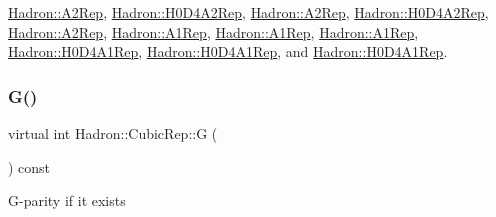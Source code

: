 \mbox{\hyperlink{structHadron_1_1A2Rep_a6c2da481eeb98634c640e8f17a569eea}{Hadron\+::\+A2\+Rep}}, \mbox{\hyperlink{structHadron_1_1H0D4A2Rep_a637522dc6caee2869b2bb632a4c5a5b5}{Hadron\+::\+H0\+D4\+A2\+Rep}}, \mbox{\hyperlink{structHadron_1_1A2Rep_a6c2da481eeb98634c640e8f17a569eea}{Hadron\+::\+A2\+Rep}}, \mbox{\hyperlink{structHadron_1_1H0D4A2Rep_a637522dc6caee2869b2bb632a4c5a5b5}{Hadron\+::\+H0\+D4\+A2\+Rep}}, \mbox{\hyperlink{structHadron_1_1A2Rep_a6c2da481eeb98634c640e8f17a569eea}{Hadron\+::\+A2\+Rep}}, \mbox{\hyperlink{structHadron_1_1A1Rep_a0d1f85837b8f29f9e51656b8bf2abfed}{Hadron\+::\+A1\+Rep}}, \mbox{\hyperlink{structHadron_1_1A1Rep_a0d1f85837b8f29f9e51656b8bf2abfed}{Hadron\+::\+A1\+Rep}}, \mbox{\hyperlink{structHadron_1_1A1Rep_a0d1f85837b8f29f9e51656b8bf2abfed}{Hadron\+::\+A1\+Rep}}, \mbox{\hyperlink{structHadron_1_1H0D4A1Rep_ab13ff026da1bc59df4b52835038296d5}{Hadron\+::\+H0\+D4\+A1\+Rep}}, \mbox{\hyperlink{structHadron_1_1H0D4A1Rep_ab13ff026da1bc59df4b52835038296d5}{Hadron\+::\+H0\+D4\+A1\+Rep}}, and \mbox{\hyperlink{structHadron_1_1H0D4A1Rep_ab13ff026da1bc59df4b52835038296d5}{Hadron\+::\+H0\+D4\+A1\+Rep}}.

\mbox{\label{structHadron_1_1CubicRep_a52104e43266d1614c00bbd1c3b395458}} 
\subsubsection{\texorpdfstring{G()}{G()}\hspace{0.1cm}{\footnotesize\ttfamily [3/3]}}
{\footnotesize\ttfamily virtual int Hadron\+::\+Cubic\+Rep\+::G (\begin{DoxyParamCaption}{ }\end{DoxyParamCaption}) const\hspace{0.3cm}{\ttfamily [pure virtual]}}

G-\/parity if it exists 

